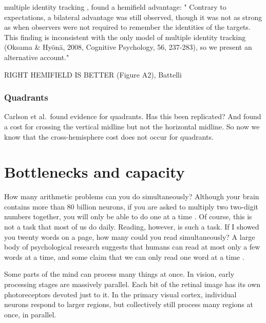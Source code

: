 \documentclass[]{book}
\begin{document}
\citet{hudsonHemifieldEffectsMultiple2012} multiple identity tracking , found a hemifield advantage: " Contrary to expectations, a bilateral advantage was still observed, though it was not as strong as when observers were not required to remember the identities of the targets. This finding is inconsistent with the only model of multiple identity tracking (Oksama \& Hyönä, 2008, Cognitive Psychology, 56, 237-283), so we present an alternative account."

\citet{strongHemifieldspecificControlSpatial2019}

RIGHT HEMIFIELD IS BETTER \citet{holcombeObjectTrackingAbsence2014} (Figure A2), Battelli

\hypertarget{quadrants}{%
\subsection{Quadrants}\label{quadrants}}

Carlson et al.~found evidence for quadrants. Has this been replicated? And \citet{strongHemifieldspecificControlSpatial2019} found a cost for crossing the vertical midline but not the horizontal midline. So now we know that the cross-hemisphere cost does not occur for quadrants.

\hypertarget{bottlenecks-and-capacity}{%
\chapter{Bottlenecks and capacity}\label{bottlenecks-and-capacity}}

How many arithmetic problems can you do simultaneously? Although your brain contains more than 80 billion neurons, if you are asked to multiply two two-digit numbers together, you will only be able to do one at a time \citep[\citet{zylberbergBrainRouterCortical2010a}]{oberauerAccessInformationWorking2002}. Of course, this is not a task that most of us do daily. Reading, however, is such a task. If I showed you twenty words on a page, how many could you read simultaneously? A large body of psychological research suggests that humans can read at most only a few words at a time, and some claim that we can only read one word at a time \citep{whiteEvidenceSerialProcessing2018, reichleEncodingMultipleWords2009}.

Some parts of the mind can process many things at once. In vision, early processing stages are massively parallel. Each bit of the retinal image has its own photoreceptors devoted just to it. In the primary visual cortex, individual neurons respond to larger regions, but collectively still process many regions at once, in parallel.
\end{document}
